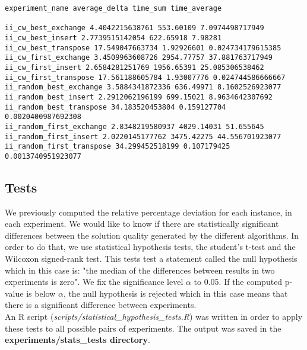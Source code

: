 \begin{lstlisting}
experiment_name average_delta time_sum time_average

ii_cw_best_exchange 4.4042215638761 553.60109 7.0974498717949
ii_cw_best_insert 2.7739515142054 622.65918 7.98281
ii_cw_best_transpose 17.549047663734 1.92926601 0.024734179615385
ii_cw_first_exchange 3.4509963608726 2954.77757 37.881763717949
ii_cw_first_insert 2.6584281251769 1956.65391 25.085306538462
ii_cw_first_transpose 17.561188605784 1.93007776 0.024744586666667
ii_random_best_exchange 3.5884341872336 636.49971 8.1602526923077
ii_random_best_insert 2.2912062196199 699.15021 8.9634642307692
ii_random_best_transpose 34.183520453804 0.159127704 0.0020400987692308
ii_random_first_exchange 2.8348219580937 4029.14031 51.655645
ii_random_first_insert 2.0220145177762 3475.42275 44.556701923077
ii_random_first_transpose 34.299452518199 0.107179425 0.0013740951923077
\end{lstlisting}

\newpage

\subsection{Tests}
We previously computed the relative percentage deviation for each instance, in
each experiment. We would like to know if there are statistically significant
differences between the solution quality generated by the different algorithms.
In order to do that, we use statistical hypothesis tests, the student's t-test
and the Wilcoxon signed-rank test. This tests test a statement called the
null hypothesis which in this case is: "the median of the differences between
results in two experiments is zero". We fix the significance level $\alpha$ to
0.05. If the computed p-value is below $\alpha$, the null hypothesis is rejected
which in this case means that there is a significant difference between
experiments.\\

An R script (\emph{scripts/statistical\_hypothesis\_tests.R}) was written in order
to apply these tests to all possible pairs of experiments. The output was saved
in the \textbf{experiments/stats\_tests directory}.\\

